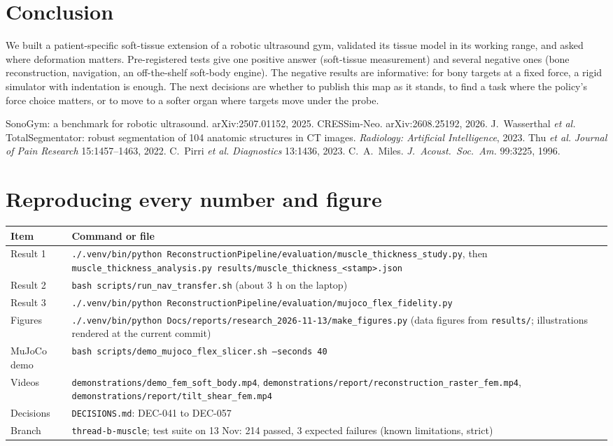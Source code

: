 \documentclass[10pt,a4paper,twocolumn]{article}
\newcommand{\src}[1]{\texttt{\footnotesize #1}}
\newcommand{\dec}[1]{\textsf{#1}}
\begin{document}
\section{Conclusion}
We built a patient-specific soft-tissue extension of a robotic ultrasound gym, validated its tissue model in its
working range, and asked where deformation matters. Pre-registered tests give one positive answer (soft-tissue
measurement) and several negative ones (bone reconstruction, navigation, an off-the-shelf soft-body engine). The
negative results are informative: for bony targets at a fixed force, a rigid simulator with indentation is enough.
The next decisions are whether to publish this map as it stands, to find a task where the policy's force choice
matters, or to move to a softer organ where targets move under the probe.

\begin{thebibliography}{9}\footnotesize
{} SonoGym: a benchmark for robotic ultrasound. arXiv:2507.01152, 2025.
 CRESSim-Neo. arXiv:2608.25192, 2026.
 J.~Wasserthal \emph{et al.} TotalSegmentator: robust segmentation of 104 anatomic structures in CT
  images. \emph{Radiology: Artificial Intelligence}, 2023.
 Thu \emph{et al.} \emph{Journal of Pain Research} 15:1457--1463, 2022.
 C.~Pirri \emph{et al.} \emph{Diagnostics} 13:1436, 2023.
 C.~A.~Miles. \emph{J.\ Acoust.\ Soc.\ Am.} 99:3225, 1996.
\end{thebibliography}

\onecolumn
\appendix
\section{Reproducing every number and figure}
\small
\begin{tabularx}{\linewidth}{@{}lX@{}}
\toprule
Item & Command or file \\
\midrule
Result 1 & \src{./.venv/bin/python ReconstructionPipeline/evaluation/muscle\_thickness\_study.py}, then
  \src{muscle\_thickness\_analysis.py results/muscle\_thickness\_<stamp>.json} \\
Result 2 & \src{bash scripts/run\_nav\_transfer.sh} (about 3~h on the laptop) \\
Result 3 & \src{./.venv/bin/python ReconstructionPipeline/evaluation/mujoco\_flex\_fidelity.py} \\
Figures & \src{./.venv/bin/python Docs/reports/research\_2026-11-13/make\_figures.py} (data figures from
  \src{results/}; illustrations rendered at the current commit) \\
MuJoCo demo & \src{bash scripts/demo\_mujoco\_flex\_slicer.sh --seconds 40} \\
Videos & \src{demonstrations/demo\_fem\_soft\_body.mp4}, \src{demonstrations/report/reconstruction\_raster\_fem.mp4},
  \src{demonstrations/report/tilt\_shear\_fem.mp4} \\
Decisions & \src{DECISIONS.md}: \dec{DEC-041} to \dec{DEC-057} \\
Branch & \src{thread-b-muscle}; test suite on 13 Nov: 214 passed, 3 expected failures (known limitations, strict) \\
\bottomrule
\end{tabularx}
\end{document}
